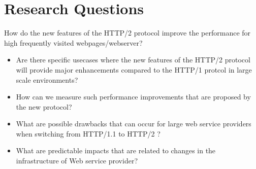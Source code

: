 \section{Research Questions}
\label{chap:rq}

How do the new features of the  HTTP/2 protocol improve the performance for high frequently visited webpages/webserver?

\begin{itemize}
\item Are there specific usecases where the new features of the HTTP/2 protocol will provide major enhancements compared to the HTTP/1 protcol in large scale environments?
\item How can we measure such performance improvements that are proposed by the new protocol?
\item What are possible drawbacks that can occur for large web service providers when switching from HTTP/1.1 to HTTP/2 ?
\item What are predictable impacts that are related to changes in the infrastructure of Web service provider?
\end{itemize}